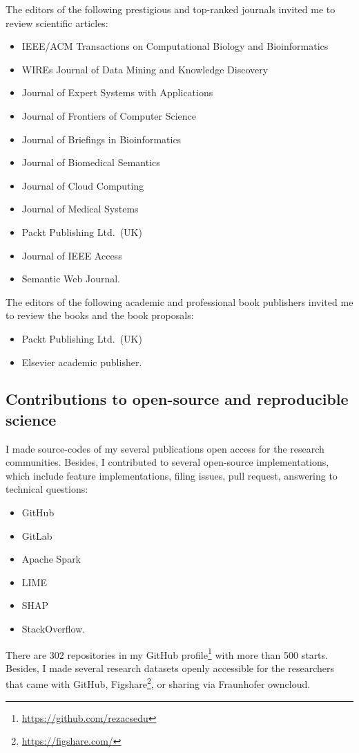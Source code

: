 \begin{appendices}
The editors of the following prestigious and top-ranked journals invited me to review scientific articles: 

\begin{itemize}[noitemsep]
    \item IEEE/ACM Transactions on Computational Biology and Bioinformatics
    \item WIREs Journal of Data Mining and Knowledge Discovery
    \item Journal of Expert Systems with Applications 
    \item Journal of Frontiers of Computer Science
    \item Journal of Briefings in Bioinformatics
    \item Journal of Biomedical Semantics
    \item Journal of Cloud Computing
    \item Journal of Medical Systems
    \item Packt Publishing Ltd.~(UK)
    \item Journal of IEEE Access 
    \item Semantic Web Journal.
\end{itemize}

The editors of the following academic and professional book publishers invited me to review the books and the book proposals: 

\begin{itemize}[noitemsep]
    \item Packt Publishing Ltd.~(UK)
    \item Elsevier academic publisher. 
\end{itemize}

\subsection*{Contributions to open-source and reproducible science %
}%
I made source-codes of my several publications open access for the research communities. Besides, I contributed to several open-source implementations, which include feature implementations, filing issues, pull request, answering to technical questions: 

\begin{itemize}[noitemsep]
    \item GitHub
    \item GitLab
    \item Apache Spark 
    \item LIME
    \item SHAP
    \item StackOverflow.
\end{itemize}

There are 302 repositories in my GitHub profile\footnote{\url{https://github.com/rezacsedu}} with more than 500 starts. Besides, I made several research datasets openly accessible for the researchers that came with GitHub, Figshare\footnote{\url{https://figshare.com/}}, or sharing via Fraunhofer owncloud.

\end{appendices}